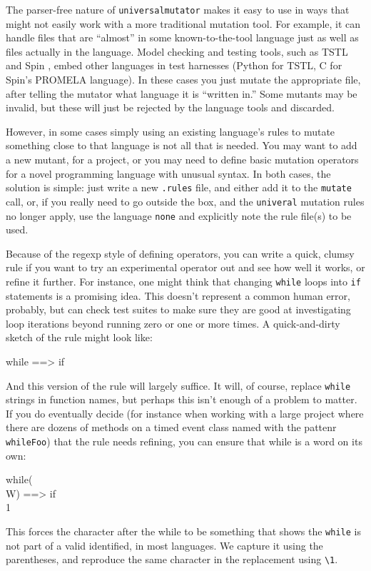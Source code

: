 The parser-free nature of {\tt universalmutator} makes it easy to
use in ways that might not easily
work with a more traditional mutation tool.  For example, it can
handle files that are ``almost'' in some known-to-the-tool language
just as well as files actually in the language.  Model checking and
testing tools, such as TSTL  and Spin \cite{SPIN}, embed other
languages in test harnesses (Python for TSTL, C for Spin's PROMELA
language).  In these cases you just mutate the appropriate file, after
telling the mutator what language it is ``written in.''  Some mutants
may be invalid, but these will just be rejected by the language tools
and discarded.

However, in some cases simply using an existing language's rules to
mutate something close to that language is not
all that is needed.  You may want to add a new mutant, for a project,
or you may need to define basic mutation operators for a novel
programming language with unusual syntax.  In both cases, the solution
is simple:  just write a new {\tt .rules} file, and either add it to
the {\tt mutate} call, or, if you really need to go outside the box,
and the {\tt univeral} mutation rules no longer apply, use the
language {\tt none} and explicitly note the rule file(s) to be used.

Because of the regexp style of defining operators, you can write a
quick, clumsy rule if you want to try an experimental operator out and
see how well it works, or refine it further.  For instance, one might
think that changing {\tt while} loops into {\tt if} statements is a
promising idea.  This doesn't represent a common human error,
probably, but can check test suites to make sure they are good at
investigating loop iterations beyond running zero or one or more
times.  A quick-and-dirty sketch of the rule might look like:

\begin{code}
while ==> if 
\end{code}

And this version of the rule will largely suffice.  It will, of
course, replace {\tt while} strings in function names, but perhaps
this isn't enough of a problem to matter.  If you do eventually decide (for instance when
working with a large project where there are dozens of methods on a
timed event class named with the pattenr {\tt whileFoo}) that the rule
needs refining, you can ensure that while is a word on its own:

\begin{code}
while(\\W) ==> if\\1 
\end{code}

\noindent This forces the character after the while to be something
that shows the {\tt while} is not part of a valid identified, in most
languages.  We capture it using the parentheses, and reproduce the
same character in the replacement using {\tt \textbackslash1}.

